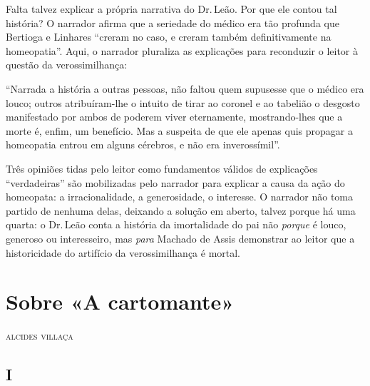 Falta talvez explicar a própria narrativa do Dr.\,Leão. Por que ele
contou tal história? O narrador afirma que a seriedade do médico era tão
profunda que Bertioga e Linhares ``creram no caso, e creram também
definitivamente na homeopatia''. Aqui, o narrador pluraliza as
explicações para reconduzir o leitor à questão da verossimilhança:

``Narrada a história a outras pessoas, não faltou quem supusesse que o
médico era louco; outros atribuíram-lhe o intuito de tirar ao coronel e
ao tabelião o desgosto manifestado por ambos de poderem viver
eternamente, mostrando-lhes que a morte é, enfim, um benefício. Mas a
suspeita de que ele apenas quis propagar a homeopatia entrou em alguns
cérebros, e não era inverossímil''.

Três opiniões tidas pelo leitor como fundamentos válidos de explicações
``verdadeiras'' são mobilizadas pelo narrador para explicar a causa da
ação do homeopata: a irracionalidade, a generosidade, o interesse. O
narrador não toma partido de nenhuma delas, deixando a solução em
aberto, talvez porque há uma quarta: o Dr.\,Leão conta a história da
imortalidade do pai não \emph{porque} é louco, generoso ou interesseiro,
mas \emph{para} Machado de Assis demonstrar ao leitor que a
historicidade do artifício da verossimilhança é mortal.


\chapter[Sobre «A cartomante», \emph{por Alcides Villaça}]{Sobre «A cartomante»}

\begin{flushright}
\textsc{alcides villaça}
\end{flushright}

\section*{I}

